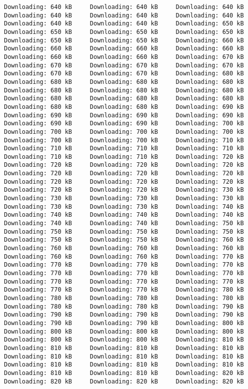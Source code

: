 \documentclass[gc, manuscript]{copernicus}
\begin{document}
\begin{verbatim}
Downloading: 640 kB     Downloading: 640 kB     Downloading: 640 kB     Downloading: 640 kB     Downloading: 640 kB     Downloading: 640 kB     Downloading: 640 kB     Downloading: 640 kB     Downloading: 650 kB     Downloading: 650 kB     Downloading: 650 kB     Downloading: 650 kB     Downloading: 650 kB     Downloading: 650 kB     Downloading: 660 kB     Downloading: 660 kB     Downloading: 660 kB     Downloading: 660 kB     Downloading: 660 kB     Downloading: 660 kB     Downloading: 670 kB     Downloading: 670 kB     Downloading: 670 kB     Downloading: 670 kB     Downloading: 670 kB     Downloading: 670 kB     Downloading: 680 kB     Downloading: 680 kB     Downloading: 680 kB     Downloading: 680 kB     Downloading: 680 kB     Downloading: 680 kB     Downloading: 680 kB     Downloading: 680 kB     Downloading: 680 kB     Downloading: 680 kB     Downloading: 680 kB     Downloading: 680 kB     Downloading: 690 kB     Downloading: 690 kB     Downloading: 690 kB     Downloading: 690 kB     Downloading: 690 kB     Downloading: 690 kB     Downloading: 700 kB     Downloading: 700 kB     Downloading: 700 kB     Downloading: 700 kB     Downloading: 700 kB     Downloading: 700 kB     Downloading: 710 kB     Downloading: 710 kB     Downloading: 710 kB     Downloading: 710 kB     Downloading: 710 kB     Downloading: 710 kB     Downloading: 720 kB     Downloading: 720 kB     Downloading: 720 kB     Downloading: 720 kB     Downloading: 720 kB     Downloading: 720 kB     Downloading: 720 kB     Downloading: 720 kB     Downloading: 720 kB     Downloading: 720 kB     Downloading: 720 kB     Downloading: 720 kB     Downloading: 730 kB     Downloading: 730 kB     Downloading: 730 kB     Downloading: 730 kB     Downloading: 730 kB     Downloading: 730 kB     Downloading: 740 kB     Downloading: 740 kB     Downloading: 740 kB     Downloading: 740 kB     Downloading: 740 kB     Downloading: 740 kB     Downloading: 750 kB     Downloading: 750 kB     Downloading: 750 kB     Downloading: 750 kB     Downloading: 750 kB     Downloading: 750 kB     Downloading: 760 kB     Downloading: 760 kB     Downloading: 760 kB     Downloading: 760 kB     Downloading: 760 kB     Downloading: 760 kB     Downloading: 770 kB     Downloading: 770 kB     Downloading: 770 kB     Downloading: 770 kB     Downloading: 770 kB     Downloading: 770 kB     Downloading: 770 kB     Downloading: 770 kB     Downloading: 770 kB     Downloading: 770 kB     Downloading: 770 kB     Downloading: 770 kB     Downloading: 780 kB     Downloading: 780 kB     Downloading: 780 kB     Downloading: 780 kB     Downloading: 780 kB     Downloading: 780 kB     Downloading: 790 kB     Downloading: 790 kB     Downloading: 790 kB     Downloading: 790 kB     Downloading: 790 kB     Downloading: 790 kB     Downloading: 800 kB     Downloading: 800 kB     Downloading: 800 kB     Downloading: 800 kB     Downloading: 800 kB     Downloading: 800 kB     Downloading: 810 kB     Downloading: 810 kB     Downloading: 810 kB     Downloading: 810 kB     Downloading: 810 kB     Downloading: 810 kB     Downloading: 810 kB     Downloading: 810 kB     Downloading: 810 kB     Downloading: 810 kB     Downloading: 810 kB     Downloading: 810 kB     Downloading: 820 kB     Downloading: 820 kB     Downloading: 820 kB     Downloading: 820 kB     
\end{verbatim}
\end{document}
